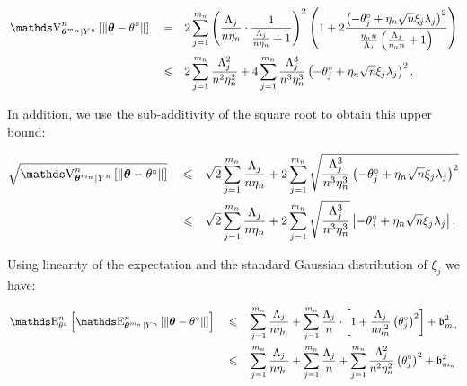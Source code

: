 \begin{pro}
\begin{alignat*}{3}
&\V_{\boldsymbol{\theta}^{m_{n}} \vert Y^{n}}^{n}\left[\Vert \boldsymbol{\theta} - \theta^{\circ} \Vert\right] &&=&& 2 \sum\limits_{j = 1}^{m_{n}} \left(\frac{\Lambda_{j}}{n \eta_{n}}\cdot \frac{1}{\frac{\Lambda_{j}}{n \eta_{n}} + 1}\right)^{2}\left(1 + 2 \frac{\left(- \theta^{\circ}_{j} + \eta_{n} \sqrt{n} \xi_{j} \lambda_{j}\right)^{2}}{\frac{\eta_{n} n}{\Lambda_{j}}\left(\frac{\Lambda_{j}}{\eta_{n} n} + 1\right)}\right)\\
& &&\leq && 2 \sum\limits_{j = 1}^{m_{n}} \frac{\Lambda_{j}^{2}}{n^{2} \eta_{n}^{2}} + 4 \sum\limits_{j = 1}^{m_{n}} \frac{\Lambda_{j}^{3}}{n^{3} \eta_{n}^{3}} \left(- \theta^{\circ}_{j} + \eta_{n} \sqrt{n} \xi_{j} \lambda_{j}\right)^{2}.
\end{alignat*}

In addition, we use the sub-additivity of the square root to obtain this upper bound:

\begin{alignat*}{3}
& \sqrt{\V_{\boldsymbol{\theta}^{m_{n}} \vert Y^{n}}^{n}\left[\Vert \boldsymbol{\theta} - \theta^{\circ} \Vert\right]} && \leq && \sqrt{2} \sum\limits_{j = 1}^{m_{n}} \frac{\Lambda_{j}}{n \eta_{n}} + 2 \sum\limits_{j = 1}^{m_{n}} \sqrt{\frac{\Lambda_{j}^{3}}{n^{3} \eta_{n}^{3}} \left(- \theta^{\circ}_{j} + \eta_{n} \sqrt{n} \xi_{j} \lambda_{j}\right)^{2}}\\
& && \leq && \sqrt{2} \sum\limits_{j = 1}^{m_{n}} \frac{\Lambda_{j}}{n \eta_{n}} + 2 \sum\limits_{j = 1}^{m_{n}} \sqrt{\frac{\Lambda_{j}^{3}}{n^{3} \eta_{n}^{3}}} \left\vert- \theta^{\circ}_{j} + \eta_{n} \sqrt{n} \xi_{j} \lambda_{j}\right\vert.
\end{alignat*}

Using linearity of the expectation and the standard Gaussian distribution of $\xi_{j}$ we have:

\begin{alignat*}{3}
&\E_{\theta^{\circ}}^{n}\left[\E_{\boldsymbol{\theta}^{m_{n}} \vert Y^{n}}^{n}\left[\Vert \boldsymbol{\theta} - \theta^{\circ} \Vert\right]\right] && \leq && \sum\limits_{j = 1}^{m_{n}} \frac{\Lambda_{j}}{n \eta_{n}} + \sum\limits_{j = 1}^{m_{n}} \frac{\Lambda_{j}}{n} \cdot \left[1 + \frac{\Lambda_{j}}{n \eta_{n}^{2}} \left(\theta^{\circ}_{j} \right)^{2}\right] + \mathfrak{b}_{m_{n}}^{2}\\
& &&\leq&& \sum\limits_{j = 1}^{m_{n}} \frac{\Lambda_{j}}{n \eta_{n}} + \sum\limits_{j = 1}^{m_{n}} \frac{\Lambda_{j}}{n} + \sum\limits_{j = 1}^{m_{n}}\frac{\Lambda_{j}^{2}}{n^{2} \eta_{n}^{2}} \left(\theta^{\circ}_{j} \right)^{2} + \mathfrak{b}_{m_{n}}^{2}\\
\end{alignat*}


\end{pro}
